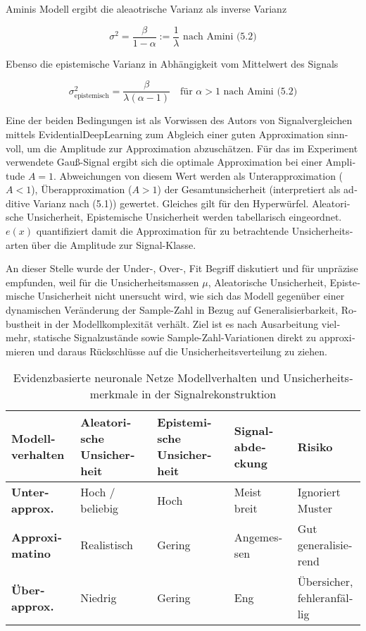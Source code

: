 \begin{otherlanguage}{ngerman}
Aminis Modell ergibt die aleaotrische Varianz als inverse Varianz 

\[
\sigma^{2} = \frac{\beta}{1 - \alpha} := \frac{1}{\lambda} \text{ nach Amini (5.2)}
\]

Ebenso die epistemische Varianz in Abhängigkeit vom Mittelwert des Signals

\[
\sigma^2_{\text{epistemisch}} = \frac{\beta}{\lambda(\alpha - 1)} \quad \text{für } \alpha > 1 \text{ nach Amini (5.2)}
\]

Eine der beiden Bedingungen ist als Vorwissen des Autors von Signalvergleichen mittels \gls{EvidentialDeepLearning} zum Abgleich einer guten Approximation sinnvoll, um die Amplitude zur Approximation abzuschätzen. Für das im Experiment verwendete Gauß-Signal ergibt sich die optimale Approximation bei einer Amplitude $A = 1$. Abweichungen von diesem Wert werden als Unterapproximation ($A < 1$), Überapproximation ($A > 1$) der Gesamtunsicherheit (interpretiert als additive Varianz nach (5.1)) gewertet. Gleiches gilt für den Hyperwürfel. \gls{Aleatorische Unsicherheit}, \gls{Epistemische Unsicherheit} werden tabellarisch eingeordnet. $e(x)$ quantifiziert damit die Approximation für zu betrachtende Unsicherheitsarten über die Amplitude zur Signal-Klasse. 

An dieser Stelle wurde der Under-, Over-, Fit Begriff diskutiert und für unpräzise empfunden, weil für die Unsicherheitsmassen $\mu$, \gls{Aleatorische Unsicherheit}, \gls{Epistemische Unsicherheit} nicht unersucht wird, wie sich das Modell gegenüber einer dynamischen Veränderung der Sample-Zahl in Bezug auf Generalisierbarkeit, Robustheit in der Modellkomplexität verhält. Ziel ist es nach Ausarbeitung vielmehr, statische Signalzustände sowie Sample-Zahl-Variationen direkt zu approximieren und daraus Rückschlüsse auf die Unsicherheitsverteilung zu ziehen.


\begin{table}[h!]
\centering
\begin{tabular}{@{}lllll@{}}
\toprule
\textbf{Modellverhalten} & \textbf{\gls{Aleatorische Unsicherheit}} & \textbf{\gls{Epistemische Unsicherheit}} & \textbf{Signalabdeckung} & \textbf{Risiko} \\
\midrule
\textbf{Unterapprox.}   & Hoch / beliebig & Hoch    & Meist breit   & Ignoriert Muster \\
\textbf{Approximatino}  & Realistisch     & Gering  & Angemessen    & Gut generalisierend \\
\textbf{Überapprox.}    & Niedrig         & Gering  & Eng           & Übersicher, fehleranfällig \\
\bottomrule
\end{tabular}
\caption{\gls{Evidenzbasierte neuronale Netze} Modellverhalten und Unsicherheitsmerkmale in der Signalrekonstruktion}
\end{table}




\end{otherlanguage}
